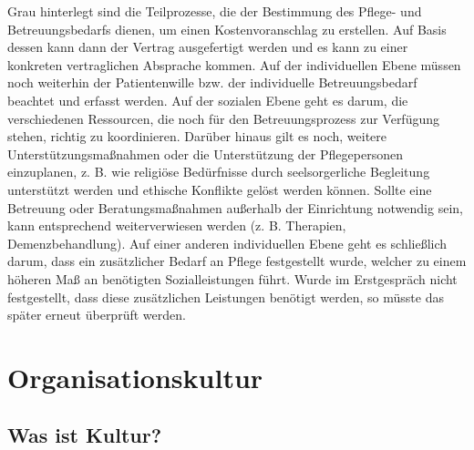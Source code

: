 \documentclass[
  letterpaper,
]{book}
\begin{document}
Grau hinterlegt sind die Teilprozesse, die der Bestimmung des Pflege-
und Betreuungsbedarfs dienen, um einen Kostenvoranschlag zu erstellen.
Auf Basis dessen kann dann der Vertrag ausgefertigt werden und es kann
zu einer konkreten vertraglichen Absprache kommen. Auf der individuellen
Ebene müssen noch weiterhin der Patientenwille bzw. der individuelle
Betreuungsbedarf beachtet und erfasst werden. Auf der sozialen Ebene
geht es darum, die verschiedenen Ressourcen, die noch für den
Betreuungsprozess zur Verfügung stehen, richtig zu koordinieren. Darüber
hinaus gilt es noch, weitere Unterstützungsmaßnahmen oder die
Unterstützung der Pflegepersonen einzuplanen, z. B. wie religiöse
Bedürfnisse durch seelsorgerliche Begleitung unterstützt werden und
ethische Konflikte gelöst werden können. Sollte eine Betreuung oder
Beratungsmaßnahmen außerhalb der Einrichtung notwendig sein, kann
entsprechend weiterverwiesen werden (z. B. Therapien, Demenzbehandlung).
Auf einer anderen individuellen Ebene geht es schließlich darum, dass
ein zusätzlicher Bedarf an Pflege festgestellt wurde, welcher zu einem
höheren Maß an benötigten Sozialleistungen führt. Wurde im Erstgespräch
nicht festgestellt, dass diese zusätzlichen Leistungen benötigt werden,
so müsste das später erneut überprüft werden.

\section{Organisationskultur}\label{organisationskultur}

\subsection{Was ist Kultur?}\label{was-ist-kultur}
\end{document}
